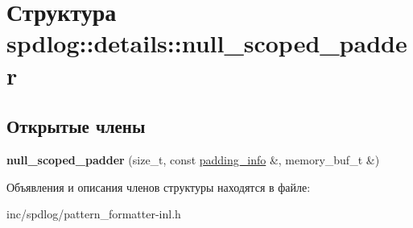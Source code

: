 \hypertarget{structspdlog_1_1details_1_1null__scoped__padder}{}\section{Структура spdlog\+:\+:details\+:\+:null\+\_\+scoped\+\_\+padder}
\label{structspdlog_1_1details_1_1null__scoped__padder}
\subsection*{Открытые члены}
\begin{DoxyCompactItemize}
\item 
\mbox{\label{structspdlog_1_1details_1_1null__scoped__padder_a363ff2b1cec00dc7d6523b4eb644fb0a}} 
{\bfseries null\+\_\+scoped\+\_\+padder} (size\+\_\+t, const \hyperlink{structspdlog_1_1details_1_1padding__info}{padding\+\_\+info} \&, memory\+\_\+buf\+\_\+t \&)
\end{DoxyCompactItemize}


Объявления и описания членов структуры находятся в файле\+:\begin{DoxyCompactItemize}
\item 
inc/spdlog/pattern\+\_\+formatter-\/inl.\+h\end{DoxyCompactItemize}
